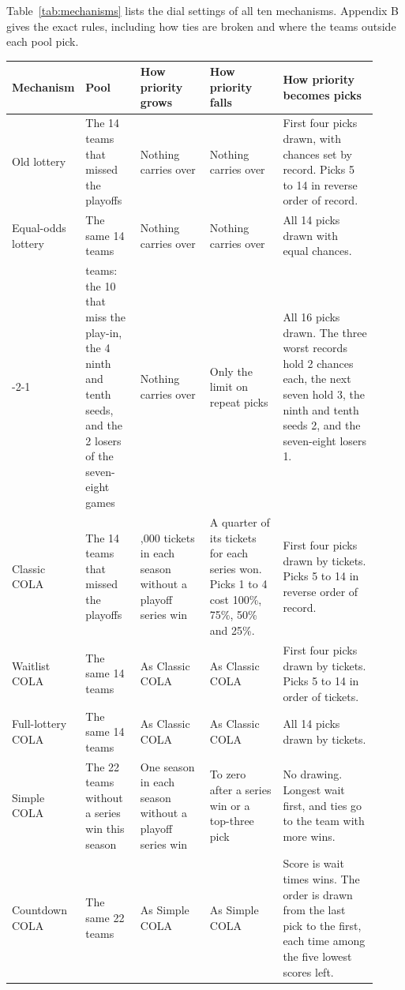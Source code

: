 \documentclass[11pt,letterpaper]{article}
\begin{document}
Table~\ref{tab:mechanisms} lists the dial settings of all ten mechanisms. Appendix B gives the exact rules, including how ties are broken and where the teams outside each pool pick.
\begin{table}[htbp]
\centering
\small
\setlength{\tabcolsep}{4pt}
\begin{tabular}{@{}>{\raggedright\arraybackslash}p{0.12\linewidth}>{\raggedright\arraybackslash}p{0.15\linewidth}>{\raggedright\arraybackslash}p{0.19\linewidth}>{\raggedright\arraybackslash}p{0.20\linewidth}>{\raggedright\arraybackslash}p{0.26\linewidth}@{}}
\toprule
\textbf{Mechanism} & \textbf{Pool} & \textbf{How priority grows} & \textbf{How priority falls} & \textbf{How priority becomes picks} \\
\midrule
Old lottery & The 14 teams that missed the playoffs & Nothing carries over & Nothing carries over & First four picks drawn, with chances set by record. Picks 5 to 14 in reverse order of record. \\
\addlinespace
Equal-odds lottery & The same 14 teams & Nothing carries over & Nothing carries over & All 14 picks drawn with equal chances. \\
\addlinespace
3-2-1 & 16 teams: the 10 that miss the play-in, the 4 ninth and tenth seeds, and the 2 losers of the seven-eight games & Nothing carries over & Only the limit on repeat picks & All 16 picks drawn. The three worst records hold 2 chances each, the next seven hold 3, the ninth and tenth seeds 2, and the seven-eight losers 1. \\
\addlinespace
Classic COLA & The 14 teams that missed the playoffs & 1,000 tickets in each season without a playoff series win & A quarter of its tickets for each series won. Picks 1 to 4 cost 100\%, 75\%, 50\% and 25\%. & First four picks drawn by tickets. Picks 5 to 14 in reverse order of record. \\
\addlinespace
Waitlist COLA & The same 14 teams & As Classic COLA & As Classic COLA & First four picks drawn by tickets. Picks 5 to 14 in order of tickets. \\
\addlinespace
Full-lottery COLA & The same 14 teams & As Classic COLA & As Classic COLA & All 14 picks drawn by tickets. \\
\addlinespace
Simple COLA & The 22 teams without a series win this season & One season in each season without a playoff series win & To zero after a series win or a top-three pick & No drawing. Longest wait first, and ties go to the team with more wins. \\
\addlinespace
Countdown COLA & The same 22 teams & As Simple COLA & As Simple COLA & Score is wait times wins. The order is drawn from the last pick to the first, each time among the five lowest scores left. \\

\end{tabular}
\end{table}
\end{document}
